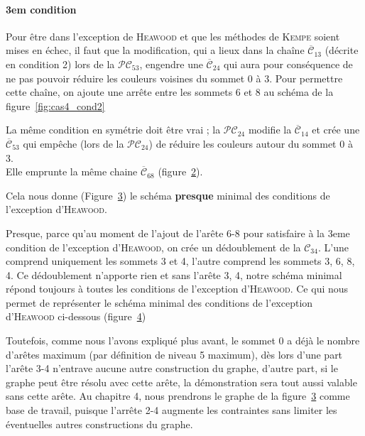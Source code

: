 \paragraph{3em condition}
Pour être dans l'exception de \textsc{Heawood} et que les méthodes de \textsc{Kempe} soient mises en échec, il faut que la modification, qui a lieux dans la chaîne  $\overline{\mathcal{C}}_{13}$  (décrite en condition 2) lors de la  $\mathcal{PC}_{53}$, engendre une  $\overline{\mathcal{C}}_{24}$ qui aura pour conséquence de ne pas pouvoir réduire les couleurs voisines du sommet 0 à 3.
Pour permettre cette chaîne, on ajoute une arrête entre les sommets 6 et 8 au schéma de la figure~\ref{fig:cas4_cond2}
\begin{figure}[!ht]\centering
		
	\caption{}\label{fig:cas4_cond3_1}
\end{figure}
\FloatBarrier
La même condition en symétrie doit être vrai ; la  $\mathcal{PC}_{24}$ modifie la  $\overline{\mathcal{C}}_{14}$ et crée une  $\overline{\mathcal{C}}_{53}$ qui empêche (lors de la $\mathcal{PC}_{24}$) de réduire les couleurs autour du sommet 0 à 3.\\
Elle emprunte la même chaine  $\overline{\mathcal{C}}_{68}$ (figure~\ref{fig:cas4_cond3_2}).
\begin{figure}[!ht]\centering
		
	\caption{}\label{fig:cas4_cond3_2}
\end{figure}
\FloatBarrier
Cela nous donne (Figure~\ref{fig:cas4_cond3_3}) le schéma \textbf{presque} minimal des conditions de l'exception d'\textsc{Heawood}. 
\begin{figure}[!ht]\centering
		
	\caption{}\label{fig:cas4_cond3_3}
\end{figure}
\FloatBarrier
Presque, parce qu'au moment de l'ajout de l’arête 6-8 pour satisfaire à la 3eme condition de l'exception d'\textsc{Heawood}, on crée un dédoublement de la  $\mathcal{C}_{34}$. L'une comprend uniquement les sommets 3 et 4, l'autre comprend les sommets 3, 6, 8, 4.
Ce dédoublement n'apporte rien et sans l’arête 3, 4, notre schéma minimal répond toujours à toutes les conditions de l'exception d'\textsc{Heawood}.
Ce qui nous permet de représenter le schéma minimal des conditions de l'exception d'\textsc{Heawood} ci-dessous (figure~\ref{fig:cas4_cond3_4})
\begin{figure}[!ht]\centering
		
	\caption{}\label{fig:cas4_cond3_4}
\end{figure}
\FloatBarrier
Toutefois, comme nous l'avons expliqué plus avant, le sommet 0 a déjà le nombre d’arêtes maximum (par définition de niveau 5 maximum), dès lors d'une part l’arête 3-4 n'entrave aucune autre construction du graphe, d'autre part, si le graphe peut être résolu avec cette arête, la démonstration sera tout aussi valable sans cette arête. Au chapitre 4, nous prendrons le graphe de la figure~\ref{fig:cas4_cond3_3} comme base de travail, puisque l'arrête 2-4 augmente les contraintes sans limiter les éventuelles autres constructions du graphe.\\

